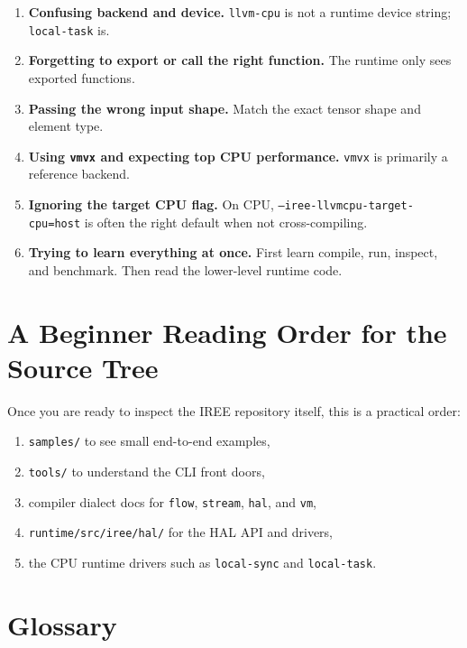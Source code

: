 \documentclass[11pt,a4paper]{article}
\begin{document}
\begin{enumerate}
    \item \textbf{Confusing backend and device.} \texttt{llvm-cpu} is not a runtime device string; \texttt{local-task} is.
    \item \textbf{Forgetting to export or call the right function.} The runtime only sees exported functions.
    \item \textbf{Passing the wrong input shape.} Match the exact tensor shape and element type.
    \item \textbf{Using \texttt{vmvx} and expecting top CPU performance.} \texttt{vmvx} is primarily a reference backend.
    \item \textbf{Ignoring the target CPU flag.} On CPU, \texttt{--iree-llvmcpu-target-cpu=host} is often the right default when not cross-compiling.
    \item \textbf{Trying to learn everything at once.} First learn compile, run, inspect, and benchmark. Then read the lower-level runtime code.
\end{enumerate}

\section{A Beginner Reading Order for the Source Tree}

Once you are ready to inspect the IREE repository itself, this is a practical order:

\begin{enumerate}
    \item \texttt{samples/} to see small end-to-end examples,
    \item \texttt{tools/} to understand the CLI front doors,
    \item compiler dialect docs for \texttt{flow}, \texttt{stream}, \texttt{hal}, and \texttt{vm},
    \item \texttt{runtime/src/iree/hal/} for the HAL API and drivers,
    \item the CPU runtime drivers such as \texttt{local-sync} and \texttt{local-task}.
\end{enumerate}

\section{Glossary}
\end{document}
